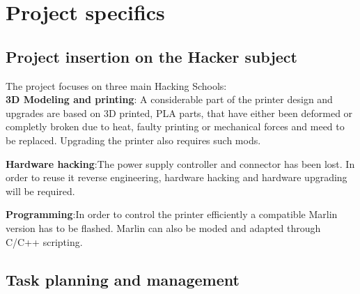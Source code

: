 \documentclass[a4paper,12pt]{article}
\begin{document}
	\section{Project specifics}
		
		\subsection{Project insertion on the Hacker subject}
		The project focuses on three main Hacking Schools: \\[0.5cm]
		\textbf{3D Modeling and printing}: A considerable part of the printer design and upgrades are based on 3D printed, PLA parts, that have either been deformed or completly broken due to heat, faulty printing or mechanical forces and meed to be replaced. Upgrading the printer also requires such mods. \par
		\textbf{Hardware hacking}:The power supply controller and connector has been lost. In order to reuse it reverse engineering, hardware hacking and hardware upgrading will be required. \par
		\textbf{Programming}:In order to control the printer efficiently a compatible Marlin version has to be flashed. Marlin can also be moded and adapted through C/C++ scripting.\par
		

		\subsection{Task planning and management}
\end{document}
